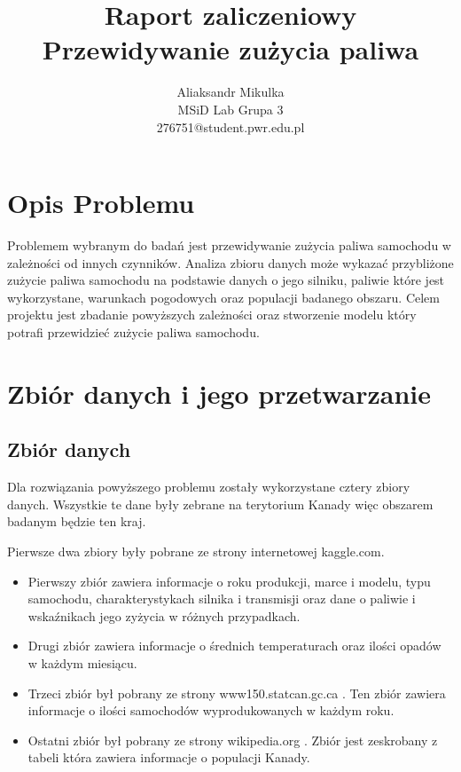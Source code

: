 \documentclass[9pt,a4paper,twoside]{rho}
\title{Raport zaliczeniowy\\
Przewidywanie zużycia paliwa}
\author{Aliaksandr Mikulka\\
MSiD Lab Grupa 3\\
276751@student.pwr.edu.pl
}
\begin{document}
    \maketitle
\section*{Opis Problemu}

    Problemem wybranym do badań jest przewidywanie zużycia paliwa samochodu w zależności od innych czynników. Analiza zbioru danych może wykazać przybliżone zużycie paliwa samochodu na podstawie danych o jego silniku, paliwie które jest wykorzystane, warunkach pogodowych oraz populacji badanego obszaru. Celem projektu jest zbadanie powyższych zależności oraz stworzenie modelu który potrafi przewidzieć zużycie paliwa samochodu.

\section*{Zbiór danych i jego przetwarzanie}
    \subsection*{Zbiór danych}
    
        Dla rozwiązania powyższego problemu zostały wykorzystane cztery zbiory danych. Wszystkie te dane były zebrane na terytorium Kanady więc obszarem badanym będzie ten kraj.
        
        Pierwsze dwa zbiory były pobrane ze strony internetowej kaggle.com.
        \begin{itemize}
        \item Pierwszy zbiór \cite{kaggle_fuel} zawiera informacje o roku produkcji, marce i modelu, typu samochodu, charakterystykach silnika i transmisji oraz dane o paliwie i wskaźnikach jego zyżycia w różnych przypadkach.
        \item Drugi zbiór \cite{kaggle_temp} zawiera informacje o średnich temperaturach oraz ilości opadów w każdym miesiącu.
        \item Trzeci zbiór \cite{statcan} był pobrany ze strony www150.statcan.gc.ca . Ten zbiór zawiera informacje o ilości samochodów wyprodukowanych w każdym roku.
        \item Ostatni zbiór \cite{wiki_demographics_canada} był pobrany ze strony wikipedia.org . Zbiór jest zeskrobany z tabeli która zawiera informacje o populacji Kanady.
        \end{itemize}
\end{document}
